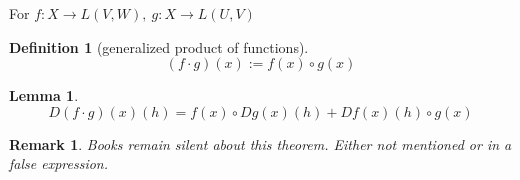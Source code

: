\documentclass{report}
\newtheorem{lem}[theo]{Lemma}
\newtheorem{defi}{Definition}[section]
\newtheorem*{remark}{Remark}
\begin{document}
\medskip
For $f: X \to L(V,W), \ g: X \to L(U, V)$
\begin{defi}[generalized product of functions]
\[
(f \cdot g) (x) := f(x) \circ g(x) 
\]
\end{defi}

\begin{lem}
\[
D(f\cdot g)(x)(h) = f(x) \circ Dg(x)(h) + Df(x)(h) \circ g(x) 
\]
\end{lem}

\begin{remark}
Books remain silent about this theorem. Either not mentioned or in a false expression.
\end{remark}


{}
\end{document}
